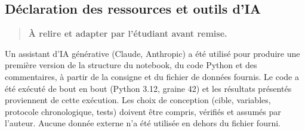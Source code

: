 \documentclass[
  10pt,
]{article}
\begin{document}
\hypertarget{duxe9claration-des-ressources-et-outils-dia}{%
\subsection{Déclaration des ressources et outils
d'IA}\label{duxe9claration-des-ressources-et-outils-dia}}

\begin{quote}
\textbf{À relire et adapter par l'étudiant avant remise.}
\end{quote}

Un assistant d'IA générative (Claude, Anthropic) a été utilisé pour
produire une première version de la structure du notebook, du code
Python et des commentaires, à partir de la consigne et du fichier de
données fournis. Le code a été exécuté de bout en bout (Python 3.12,
graine 42) et les résultats présentés proviennent de cette exécution.
Les choix de conception (cible, variables, protocole chronologique,
tests) doivent être compris, vérifiés et assumés par l'auteur. Aucune
donnée externe n'a été utilisée en dehors du fichier fourni.
\end{document}
